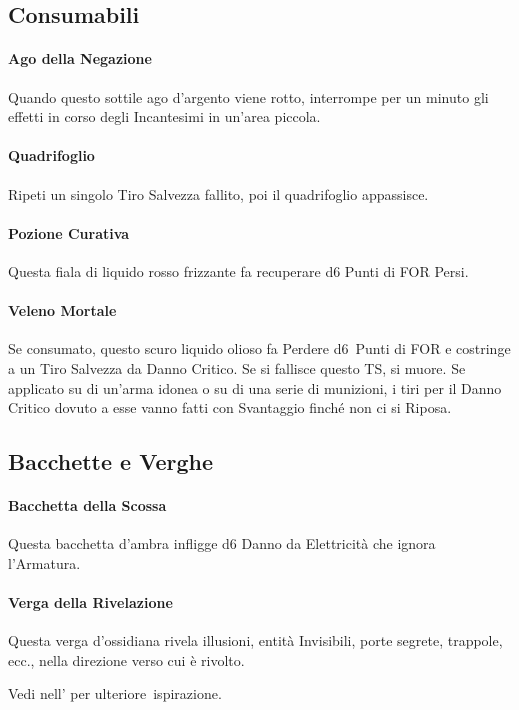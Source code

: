 \documentclass[itdr]{subfiles}
\begin{document}
\vfill

\subsection*{Consumabili}

\paragraph{Ago della Negazione}
Quando questo sottile ago d'argento viene rotto, interrompe per un minuto gli effetti in corso degli Incantesimi in un'area piccola.

\paragraph{Quadrifoglio}
Ripeti un singolo Tiro Salvezza fallito, poi il quadrifoglio appassisce.

\paragraph{Pozione Curativa}
Questa fiala di liquido rosso frizzante fa recuperare d6 Punti di FOR Persi.

\paragraph{Veleno Mortale}
Se consumato, questo scuro liquido olioso fa Perdere d6~Punti di FOR e costringe a un Tiro Salvezza da Danno Critico. Se si fallisce questo TS, si muore. Se applicato su di un'arma idonea o su di una serie di munizioni, i tiri per il Danno Critico dovuto a esse vanno fatti con Svantaggio finché non ci si Riposa.

\vfill

\subsection*{Bacchette e Verghe}

\paragraph{Bacchetta della Scossa}
Questa bacchetta d'ambra infligge d6 Danno da Elettricità che \mbox{ignora} l'Armatura.

\paragraph{Verga della Rivelazione}
Questa verga d'ossidiana rivela illusioni, entità Invisibili, porte segrete, trappole, ecc., nella direzione verso cui è rivolto.

\vfill

\begin{dbox}
	Vedi \textbf{} nell'\textbf{} per \mbox{ulteriore ispirazione}.
\end{dbox}

\vfill
\end{document}

